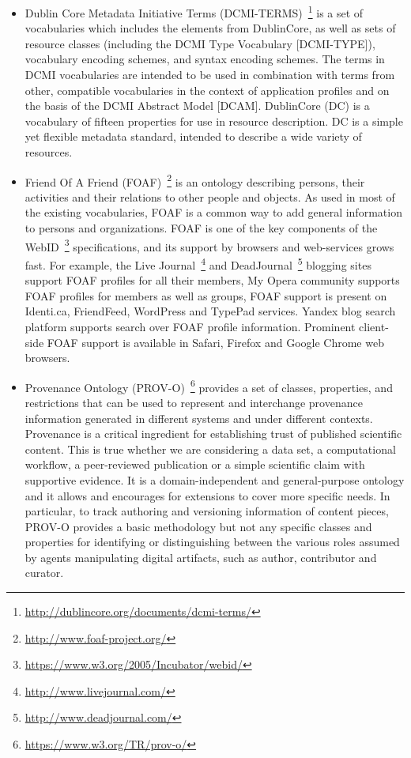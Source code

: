 \documentclass[ngerman,UKenglish,table]{scrbook}
\begin{document}
\begin{itemize}
\item Dublin Core Metadata Initiative Terms (DCMI-TERMS)~\footnote{\url{http://dublincore.org/documents/dcmi-terms/}} is a set of vocabularies which includes the elements from DublinCore, as well as sets of resource classes (including the DCMI Type Vocabulary [DCMI-TYPE]), vocabulary encoding schemes, and syntax encoding schemes.
The terms in DCMI vocabularies are intended to be used in combination with terms from other, compatible vocabularies in the context of application profiles and on the basis of the DCMI Abstract Model [DCAM].
DublinCore (DC) is a vocabulary of fifteen properties for use in resource description.
DC is a simple yet flexible metadata standard, intended to describe a wide variety of resources.

\item{Friend Of A Friend (FOAF)~\footnote{\url{http://www.foaf-project.org/}}} is an ontology describing persons, their activities and their relations to other people and objects.
As used in most of the existing vocabularies, FOAF is a common way to add general information to persons and organizations.
FOAF is one of the key components of the WebID~\footnote{\url{https://www.w3.org/2005/Incubator/webid/}} specifications, and its support by browsers and web-services grows fast.
For example, the Live Journal~\footnote{\url{http://www.livejournal.com/}} and DeadJournal~\footnote{\url{http://www.deadjournal.com/}} blogging sites support FOAF profiles for all their members, My Opera community supports FOAF profiles for members as well as groups, FOAF support is present on Identi.ca, FriendFeed, WordPress and TypePad services. Yandex blog search platform supports search over FOAF profile information.
Prominent client-side FOAF support is available in Safari, Firefox and Google Chrome web browsers. 

\item{Provenance Ontology (PROV-O)~\footnote{\url{https://www.w3.org/TR/prov-o/}}} provides a set of classes, properties, and restrictions that can be used to represent and interchange provenance information generated in different systems and under different contexts. 
Provenance is a critical ingredient for establishing trust of published scientific content.
This is true whether we are considering a data set, a computational workflow, a peer-reviewed publication or a simple scientific claim with supportive evidence.
It is a domain-independent and general-purpose ontology and it allows and encourages for extensions to cover more specific needs. 
In particular, to track authoring and versioning information of content pieces, PROV-O provides a basic methodology but not any specific classes and properties for identifying or distinguishing between the various roles assumed by agents manipulating digital artifacts, such as author, contributor and curator.

\end{itemize}
\end{document}
